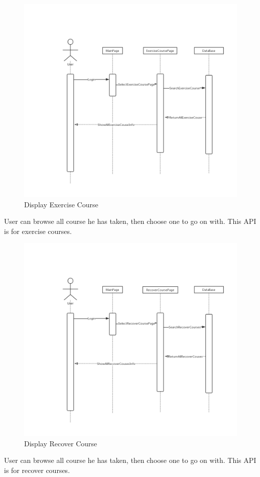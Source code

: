 \documentclass[16pt]{scrreprt}
\begin{document}
\begin{figure}[H]
    \includegraphics[width=\linewidth]{./FuncPhoto/5.png}   
    \caption{Display Exercise Course}
\end{figure}
User can browse all course he has taken, then choose one to go on with. This API is for exercise courses.

\begin{figure}[H]
    \includegraphics[width=\linewidth]{./FuncPhoto/6.png}   
    \caption{Display Recover Course}
\end{figure}
User can browse all course he has taken, then choose one to go on with. This API is for recover courses. 
\end{document}
